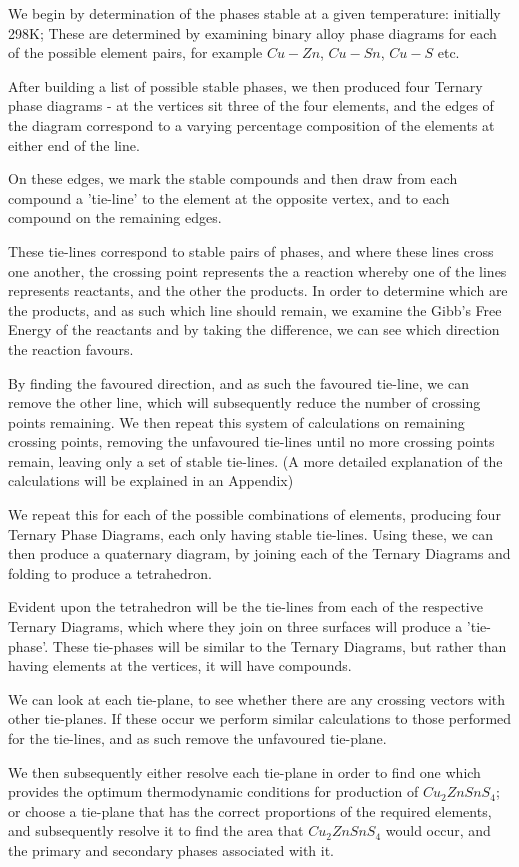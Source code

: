We begin by determination of the phases stable at a given temperature: initially 298K; These are determined by examining binary alloy phase diagrams for each of the possible element pairs, for example $Cu-Zn$, $Cu-Sn$, $Cu-S$ etc. 

After building a list of possible stable phases, we then produced four Ternary phase diagrams - at the vertices sit three of the four elements, and the edges of the diagram correspond to a varying percentage composition of the elements at either end of the line. 

On these edges, we mark the stable compounds and then draw from each compound a 'tie-line' to the element at the opposite vertex, and to each compound on the remaining edges. 

These tie-lines correspond to stable pairs of phases, and where these lines cross one another, the crossing point represents the a reaction whereby one of the lines represents reactants, and the other the products. In order to determine which are the products, and as such which line should remain, we examine the Gibb's Free Energy of the reactants and by taking the difference, we can see which direction the reaction favours. 

By finding the favoured direction, and as such the favoured tie-line, we can remove the other line, which will subsequently reduce the number of crossing points remaining. We then repeat this system of calculations on remaining crossing points, removing the unfavoured tie-lines until no more crossing points remain, leaving only a set of stable tie-lines. (A more detailed explanation of the calculations will be explained in an Appendix)

We repeat this for each of the possible combinations of elements, producing four Ternary Phase Diagrams, each only having stable tie-lines. Using these, we can then produce a quaternary diagram, by joining each of the Ternary Diagrams and folding to produce a tetrahedron. 

Evident upon the tetrahedron will be the tie-lines from each of the respective Ternary Diagrams, which where they join on three surfaces will produce a 'tie-phase'. These tie-phases will be similar to the Ternary Diagrams, but rather than having elements at the vertices, it will have compounds.

We can look at each tie-plane, to see whether there are any crossing vectors with other tie-planes. If these occur we perform similar calculations to those performed for the tie-lines, and as such remove the unfavoured tie-plane.

We then subsequently either resolve each tie-plane in order to find one which provides the optimum thermodynamic conditions for production of $Cu_2ZnSnS_4$; or choose a tie-plane that has the correct proportions of the required elements, and subsequently resolve it to find the area that $Cu_2ZnSnS_4$ would occur, and the primary and secondary phases associated with it.